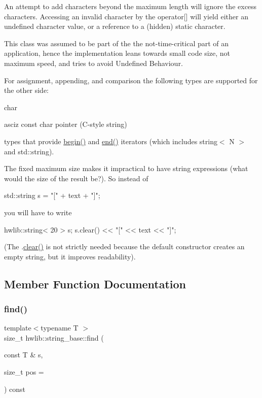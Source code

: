 An attempt to add characters beyond the maximum length will ignore the excess characters. Accessing an invalid character by the operator\mbox{[}\mbox{]} will yield either an undefined character value, or a reference to a (hidden) static character.

This class was assumed to be part of the the not-\/time-\/critical part of an application, hence the implementation leans towards small code size, not maximum speed, and tries to avoid Undefined Behaviour.

For assignment, appending, and comparison the following types are supported for the other side\+:
\begin{DoxyItemize}
\item char
\item asciz const char pointer (C-\/style string)
\item types that provide \hyperlink{classhwlib_1_1string__base_a5c4a926e11bba47de618f570ee5f3bae}{begin()} and \hyperlink{classhwlib_1_1string__base_a6b9064e8e05b29fdf7bea1cc5548b3af}{end()} iterators (which includes string$<$ N $>$ and std\+::string).
\end{DoxyItemize}

The fixed maximum size makes it impractical to have string expressions (what would the size of the result be?). So instead of \begin{DoxyVerb}std::string s = "[" + text + "]";
\end{DoxyVerb}


you will have to write \begin{DoxyVerb}hwlib::string< 20 > s; 
s.clear() << "[" << text << "]";
\end{DoxyVerb}


(The .\hyperlink{classhwlib_1_1string__base_aeca01859d90cd3b39d9320d404ad893d}{clear()} is not strictly needed because the default constructor creates an empty string, but it improves readability). 

\subsection{Member Function Documentation}
\mbox{\label{classhwlib_1_1string__base_acbe18fe0d7376795c0fb1cb059b8ce7a}} 
\subsubsection{\texorpdfstring{find()}{find()}}
{\footnotesize\ttfamily template$<$typename T $>$ \\
size\+\_\+t hwlib\+::string\+\_\+base\+::find (\begin{DoxyParamCaption}\item[{const T \&}]{s,  }\item[{size\+\_\+t}]{pos = {} }\end{DoxyParamCaption}) const\hspace{0.3cm}{\ttfamily [inline]}}

